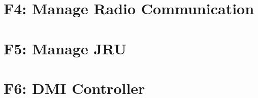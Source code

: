 \documentclass{template/openetcs_report}
\begin{document}
\section{F4: Manage Radio Communication}
 

\section{F5: Manage JRU}

\section{F6: DMI Controller}






\printindex
\end{document}
